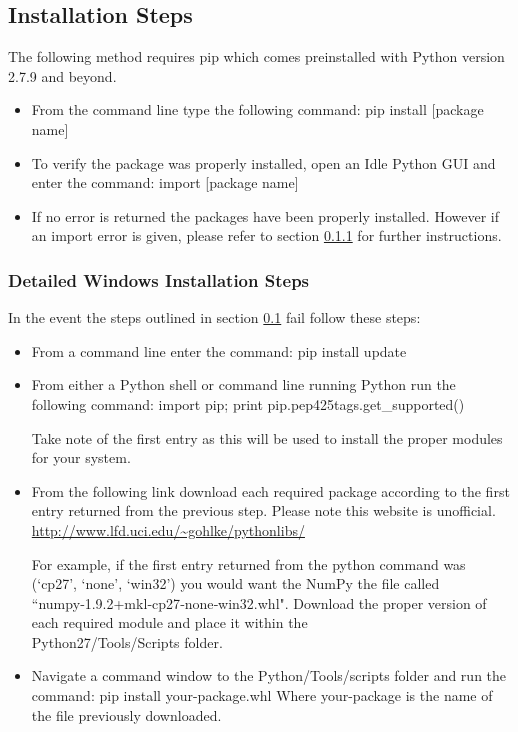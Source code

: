 \documentclass[12pt]{article}
\begin{document}
\subsection{Installation Steps} \label{Easy}
The following method requires pip which comes preinstalled with Python version 
2.7.9 and beyond. 
\begin{itemize}
\item From the command line type the following command:
pip install [package name]

\item To verify the package was properly installed, open an Idle Python GUI and 
enter the command:
import [package name]
\item If no error is returned the packages have been properly installed. However 
if an import error is given, please refer to section \ref{Detailed} for further 
instructions.
\end{itemize}
\subsubsection{Detailed Windows Installation Steps} \label{Detailed}
In the event the steps outlined in section \ref{Easy} fail follow these steps:
\begin{itemize}
\item From a command line enter the command: pip install update
\item From either a Python shell or command line running Python run the 
following command: import pip; print pip.pep425tags.get\_supported()

Take note of the first entry as this will be used to install the proper 
modules for your system.
\item From the following link download each required package according to the 
first entry returned from the previous step. Please note this website is 
unofficial. \newline
\url{http://www.lfd.uci.edu/~gohlke/pythonlibs/}

For example, if the first entry returned from the python command was (`cp27',
`none', `win32') you would want the NumPy the file called 
``numpy‑1.9.2+mkl‑cp27‑none‑win32.whl". Download the proper version of each
required module and place it within the\\
Python27/Tools/Scripts folder.
\item Navigate a command window to the Python/Tools/scripts folder and run the 
command: pip install your-package.whl  
\newline Where your-package is the name of the 
file previously downloaded.
\end{itemize}
\end{document}
